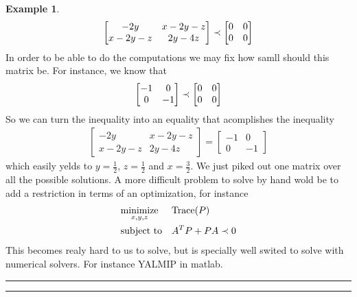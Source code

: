 \documentclass[nols]{tufte-handout}
\theoremstyle{definition}
\newtheorem{exmp}{Example}[section]
\begin{document}
\begin{exmp}
\begin{align}
    \begin{bmatrix}
        -2y & x-2y-z\\
        x-2y-z & 2y-4z
    \end{bmatrix}
    \prec \begin{bmatrix}
        0 & 0\\0 & 0
    \end{bmatrix}
\end{align}
In order to be able to do the computations we may fix how samll should this matrix be. For instance, we know that 
\begin{align}
    \begin{bmatrix}
        -1 & 0\\
        0 & -1
    \end{bmatrix}\prec \begin{bmatrix}
        0 & 0\\0 & 0
    \end{bmatrix}
\end{align}
So we can turn the inequality into an equality that acomplishes the inequality
\begin{align}
    \begin{bmatrix}
        -2y & x-2y-z\\
        x-2y-z & 2y-4z
    \end{bmatrix}
    = \begin{bmatrix}
        -1 & 0\\
        0 & -1
    \end{bmatrix}
\end{align}
which easily yelds to $y=\frac{1}{2}$, $z=\frac{1}{2}$ and $x=\frac{3}{2}$. We just piked out one matrix over all the possible solutions. A more difficult problem to solve by hand  wold be to add a restriction in terms of an optimization, for instance
\begin{align}\label{eq:extended}
    & \underset{x,y,z}{\text{minimize}}& & \text{Trace}(P) \\
    & \text{subject to}            & & A^TP+PA\prec 0\nonumber
\end{align}
This becomes realy hard to us to solve, but is specially well swited to solve with numerical solvers. For instance YALMIP in matlab.
\end{exmp}
\hrule
\hrule
\vspace{0.5cm}
\end{document}
